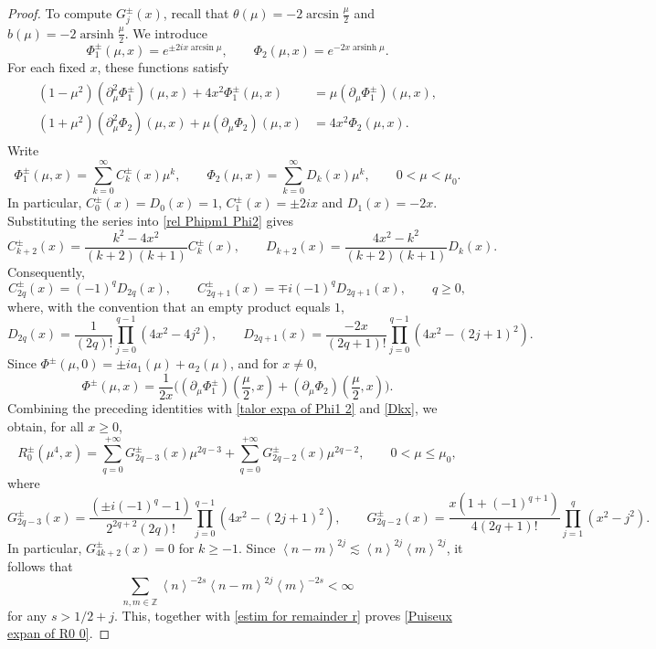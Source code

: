 \documentclass[reqno, 11pt]{amsart}
\newcommand\Z{\mathbb{Z}}
\numberwithin{equation}{section}
\begin{document}
\begin{proof}
To compute $G_j^{\pm}(x)$, recall that $\theta(\mu)=-2\arcsin\frac{\mu}{2}$ and $b(\mu)=-2\operatorname{arsinh}\frac{\mu}{2}$. We introduce 
$$\Phi^{\pm}_1(\mu,x)=e^{\pm 2ix\arcsin{\mu}},\qquad \Phi_2(\mu,x)=e^{-2x\operatorname{arsinh}\mu}.$$ 
For each fixed $x$, these functions satisfy
\begin{align}\label{rel Phipm1 Phi2}
\begin{split}
(1-\mu^2)(\partial^2_\mu\Phi^{\pm}_1)(\mu,x)+4x^2\Phi^{\pm}_1(\mu,x)&=\mu (\partial_\mu\Phi^{\pm}_1)(\mu,x),\\
(1+\mu^2)(\partial^2_\mu\Phi_2)(\mu,x)+\mu(\partial_\mu\Phi_2)(\mu,x)&=4x^2\Phi_2(\mu,x).
\end{split}
\end{align}
Write
\begin{equation}\label{talor expa of Phi1 2}
\Phi^{\pm}_1(\mu,x)=\sum\limits_{k=0}^{\infty}C^{\pm}_k(x)\mu^k,\qquad \Phi_2(\mu,x)=\sum\limits_{k=0}^{\infty}D_k(x)\mu^k,\qquad 0<\mu<\mu_0.
\end{equation}
In particular, $C^{\pm}_0(x)=D_0(x)=1$, $C^{\pm}_1(x)=\pm 2ix$ and $D_1(x)=-2x$. Substituting the series into  \eqref{rel Phipm1 Phi2} gives
\[
C_{k+2}^{\pm}(x)=\frac{k^2-4x^2}{(k+2)(k+1)}C_k^{\pm}(x),
\qquad
D_{k+2}(x)=\frac{4x^2-k^2}{(k+2)(k+1)}D_k(x).
\]
Consequently,
\[
C_{2q}^{\pm}(x)=(-1)^qD_{2q}(x),
\qquad
C_{2q+1}^{\pm}(x)=\mp i(-1)^qD_{2q+1}(x),
\qquad q\geq0,
\]
where, with the convention that an empty product equals $1$,
\begin{equation}\label{Dkx}
   D_{2q}(x)=
       \frac{1}{(2q)!}\prod\limits_{j=0}^{q-1}(4x^2-4j^2),\qquad D_{2q+1}(x)=
       \frac{-2x}{(2q+1)!}\prod\limits_{j=0}^{q-1}(4x^2-(2j+1)^2).
\end{equation}
Since $\Phi^{\pm}(\mu,0)=\pm ia_1(\mu)+a_2(\mu)$, and for $x\neq0$, 
$$\Phi^{\pm}(\mu,x)=
    \frac{1}{2x}\big((\partial_{\mu}\Phi^{\pm}_1)(\frac{\mu}{2},x)+(\partial_{\mu}\Phi_2)(\frac\mu2,x)\big).$$ 
Combining the preceding identities with \eqref{talor expa of Phi1 2} and \eqref{Dkx}, we obtain, for all $x\geq0$,
\begin{equation*}
R^{\pm}_0(\mu^4,x)=\sum\limits_{q=0}^{+\infty} G^{\pm}_{2q-3}(x)\mu^{2q-3}+\sum\limits_{q=0}^{+\infty} G^\pm_{2q-2}(x)\mu^{2q-2}, \qquad 0<\mu\leq \mu_0,
\end{equation*}
where
\begin{equation*}
   G^{\pm}_{2q-3}(x)= \frac{(\pm i(-1)^q-1)}{2^{2q+2}(2q)!}\prod\limits_{j=0}^{q-1}(4x^2-(2j+1)^2),\qquad  G^\pm_{2q-2}(x)=\frac{x(1+(-1)^{q+1})}{4(2q+1)!}\prod\limits_{j=1}^{q}(x^2-j^2).
\end{equation*}
In particular, $G^\pm_{4k+2}(x)=0$ for $k\geq-1$. Since $\left<n-m\right>^{2j}\lesssim\left<n\right>^{2j}\left<m\right>^{2j}$, it follows that $$\sum\limits_{n,m\in\Z}\left<n\right>^{-2s}\left<n-m\right>^{2j}\left<m\right>^{-2s}<\infty$$ for any $s>1/2+j$. This, together with \eqref{estim for remainder r} proves \eqref{Puiseux expan of R0 0}.


\end{proof}
\end{document}
